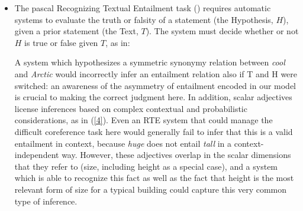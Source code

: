 \documentclass[10pt]{article}
\begin{document}
\begin{itemize}
 \item The {\sc pascal} Recognizing Textual Entailment task (\cite{rte,dagan+glickman+magnini:2005}) requires automatic systems to evaluate the truth or falsity of a 
statement (the Hypothesis, $H$), given a prior statement (the Text, $T$). The system must decide whether or not $H$ is true or false given $T$, as in:


\noindent
A system which hypothesizes a symmetric synonymy relation between \emph{cool} and \emph{Arctic} would incorrectly infer an entailment relation also if T and H were switched: an awareness of the asymmetry of entailment encoded in our model is crucial to making the correct judgment here.
In addition, scalar adjectives license inferences based on complex contextual and probabilistic considerations, as in (\ref{4}).
Even an RTE system that could manage the difficult coreference task here would generally fail to infer that this is a valid entailment in context, because \emph{huge} does not entail \emph{tall} in a context-independent way. However, these adjectives overlap in the scalar dimensions that they refer to (size, including height as a special case), and a system which is able to recognize this fact as well as the fact that height is the most relevant form of size for a typical building could capture this very common type of inference. %


\end{itemize}
\end{document}
